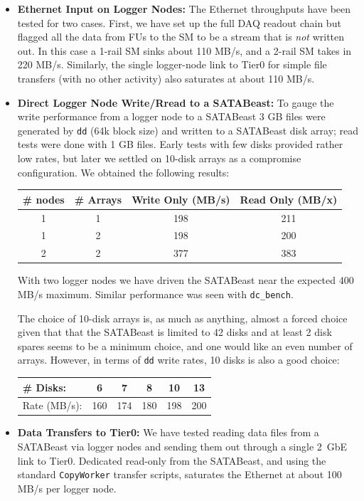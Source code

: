 \begin{itemize}
  \item {\bf Ethernet Input on Logger Nodes:} The Ethernet throughputs have been tested for two cases.
First, we have set up the full DAQ readout chain but flagged all the data from FUs to the SM
to be a stream that is {\it not} written out. In this case a 1-rail SM sinks about 110 MB/s,
and a 2-rail SM takes in 220 MB/s.
Similarly, the single logger-node link to Tier0 for simple file transfers (with no other activity)
also saturates  at about  110 MB/s.
  \item {\bf Direct Logger Node Write/Rread to a SATABeast:} To gauge the write performance 
from a logger node to a SATABeast 3 GB files were generated by \verb+dd+ (64k block size)
and written to a  SATABeast disk array; read tests were done with 1 GB files. 
Early tests with few disks provided rather low rates, but
later we settled on 10-disk arrays as a compromise configuration. 
We obtained the following results:
\begin{center}
\begin{tabular}{c|c|c|c}
\# nodes   & \# Arrays & Write Only (MB/s) & Read Only (MB/x) \\ \hline
1          &     1     &     198           &    211\\
1          &     2     &     198           &    200\\
2          &     2     &     377           &    383\\ \hline
\end{tabular}
\label{tab:ddrates}
\end{center}
With two logger nodes we have driven the SATABeast near the expected 400 MB/s maximum.
Similar performance was seen with \verb+dc_bench+.

The choice of 10-disk arrays is, as much as anything, almost a forced choice
given that that the SATABeast is limited to 42 disks and at least 2 disk spares
seems to be a minimum choice, and one would like an even number of arrays.
However, in terms of \verb+dd+ write rates, 10 disks is also a good choice:
\begin{center}
\begin{tabular}{l|c|c|c|c|c} \hline
\# Disks:      &   6    &   7    & 8    & 10   &   13\\ \hline
Rate (MB/s):   & 160    & 174    & 180  & 198  &  200\\ \hline
\end{tabular}
\label{tab:ddrates2}
\end{center}
  \item {\bf Data Transfers to Tier0:} We have tested reading data files from
a  SATABeast via logger nodes and sending them out through a single  2~GbE link
to Tier0.
Dedicated read-only from the SATABeast, and using the standard \verb+CopyWorker+
transfer scripts, saturates the Ethernet at about 100 MB/s per logger node.
\end{itemize}


